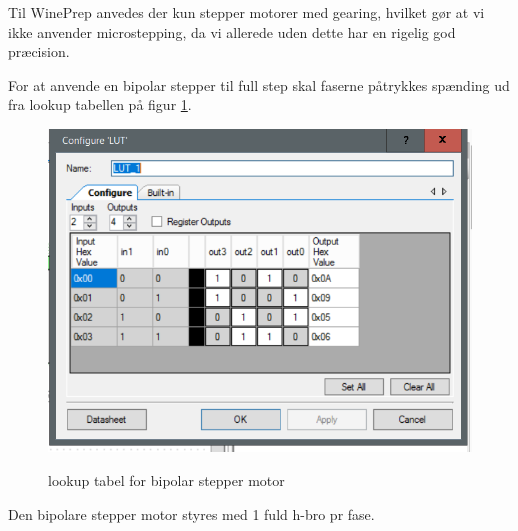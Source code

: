 Til WinePrep anvedes der kun stepper motorer med gearing, hvilket gør at vi ikke anvender microstepping, da vi allerede uden dette har en rigelig god præcision.

For at anvende en bipolar stepper til full step skal faserne påtrykkes spænding ud fra lookup tabellen på figur \ref{lookuptabel}.

\begin{figure}[H]
	\centering
	\caption{lookup tabel for bipolar stepper motor}
	\includegraphics{billeder/lookup}
	\label{lookuptabel}
\end{figure}

Den bipolare stepper motor styres med 1 fuld h-bro pr fase. 